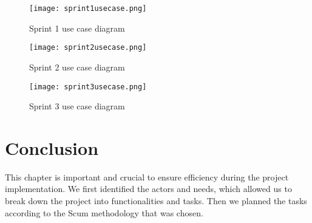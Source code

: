 \begin{figure}[!ht]
\centering
     \texttt{[image: sprint1usecase.png]}
    \caption{Sprint 1 use case diagram}
    \label{fig:sprint1usecase}
\end{figure}

\begin{figure}[!ht]
    \centering
    \texttt{[image: sprint2usecase.png]}
    \caption{Sprint 2 use case diagram}
    \label{fig:sprint2usecase}
\end{figure}


\begin{figure}[!ht]
    \centering
    \texttt{[image: sprint3usecase.png]}
    \caption{Sprint 3 use case diagram}
    \label{fig:sprint3usecase}
\end{figure}

\section*{Conclusion}
This chapter is important and crucial to ensure efficiency during the project implementation. We first identified the actors and needs, which allowed us to break down the project into functionalities and tasks. Then we planned the tasks according to the Scum methodology that was chosen.